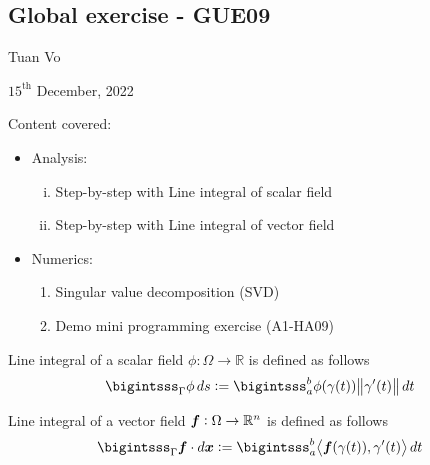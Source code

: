 \documentclass[12pt]{article}
\begin{document}
\begin{center}
	\section*{Global exercise - GUE09}
\end{center}
\begin{center}
	Tuan Vo
\end{center}
\begin{center}
	$15^{\text{th}}$ December, 2022
\end{center}
Content covered:
\begin{itemize}
	\item[\checkmark] Analysis:
		\begin{enumerate}[(i)]
			\item Step-by-step with Line integral of scalar field
			\item Step-by-step with Line integral of vector field
		\end{enumerate}
	\item[\checkmark] Numerics:
		\begin{enumerate}
			\item Singular value decomposition (SVD)
			\item Demo mini programming exercise (A1-HA09)
		\end{enumerate}
\end{itemize}
\begin{recallboxed}
	\label{recall:scalar}
	Line integral of a scalar field $\phi: \Omega \to \mathbb{R}$ is defined as follows
	\begin{align}
		\bigintsss_{\Gamma} \phi \, ds 
		:= \bigintsss_{a}^{b} \phi(\gamma(t)) \big\| \gamma'(t) \big\| \, dt
	\end{align}
\end{recallboxed}
\begin{recallboxed}
	\label{recall:vector}
	Line integral of a vector field ${\boldsymbol{\mathnormal f}}: \Omega \to \mathbb{R}^{n}$ is defined as follows
	\begin{align}
		\bigintsss_{\Gamma} \Bf \cdot d\Bx 
		:= \bigintsss_{a}^{b} \big\langle \Bf(\gamma(t)), \gamma'(t) \big\rangle \, dt
	\end{align}
\end{recallboxed}
\clearpage
\end{document}
